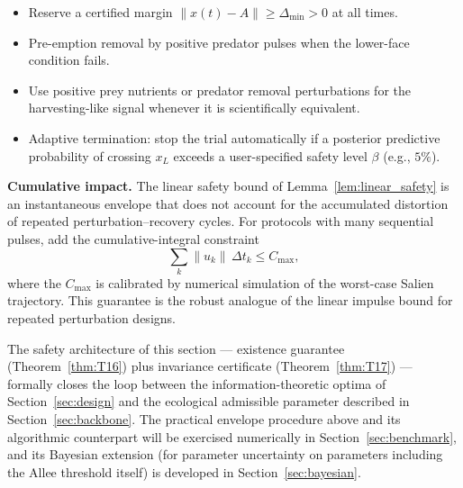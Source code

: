 \begin{itemize}
\item Reserve a certified margin \(\|x(t) - A\| \ge \Delta_{\text{min}} > 0\) at all times.
\item Pre-emption removal by positive predator pulses when the lower-face condition fails.
\item Use positive prey nutrients or predator removal perturbations for the harvesting-like signal whenever it is scientifically equivalent.
\item Adaptive termination: stop the trial automatically if a posterior predictive probability of crossing \(x_L\) exceeds a user-specified safety level \(\beta\) (e.g., \(5\%\)).
\end{itemize}

\textbf{Cumulative impact.} The linear safety bound of Lemma~\ref{lem:linear_safety} is an instantaneous envelope that does not account for the accumulated distortion of repeated perturbation--recovery cycles. For protocols with many sequential pulses, add the cumulative-integral constraint
\begin{equation}
\sum_{k} \|u_k\|\, \Delta t_k \le C_{\max},
\end{equation}
where the \(C_{\max}\) is calibrated by numerical simulation of the worst-case Salien trajectory. This guarantee is the robust analogue of the linear impulse bound for repeated perturbation designs.

The safety architecture of this section --- existence guarantee (Theorem~\ref{thm:T16}) plus invariance certificate (Theorem~\ref{thm:T17}) --- formally closes the loop between the information-theoretic optima of Section~\ref{sec:design} and the ecological admissible parameter described in Section~\ref{sec:backbone}. The practical envelope procedure above and its algorithmic counterpart will be exercised numerically in Section~\ref{sec:benchmark}, and its Bayesian extension (for parameter uncertainty on parameters including the Allee threshold itself) is developed in Section~\ref{sec:bayesian}.